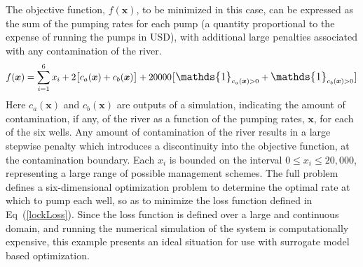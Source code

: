 \documentclass[12pt]{article}
\def \oner {
        \mathlarger{\mathds{1}}
}
\begin{document}
%
The objective function, $f(\bm{x})$, to be minimized in this case, can be expressed as the sum of the pumping rates for each pump (a quantity proportional to the expense of running the pumps in USD), with additional large penalties associated with any contamination of the river. %
\begin{equation}
f(\bm{x}) = \sum_{i=1}^6 x_i +  2\big[ c_a(\bm{x}) + c_b(\bm{x}) \big] + 20000 \big[ \oner_{c_a(\bm{x})>0} + \oner_{c_b(\bm{x})>0} \big] 
\label{lockLoss}
\end{equation}
Here $c_a(\bm{x})$ and $c_b(\bm{x})$ are outputs of a simulation, indicating the amount of contamination, if any, of the river as a function of the pumping rates, $\bm{x}$, for each of the six wells.
%
Any amount of contamination of the river results in a large stepwise penalty which introduces a discontinuity into the objective function, at the contamination boundary.
%
Each $x_i$ is bounded on the interval \mbox{$0\le x_i\le20,000$}, representing a large range of possible management schemes.
%
The full problem defines a six-dimensional optimization problem to determine the optimal rate at which to pump each well, so as to minimize the loss function defined in Eq~(\ref{lockLoss}).
%
Since the loss function is defined over a large and continuous domain, and running the numerical simulation of the system is computationally expensive, this example presents an ideal situation for use with surrogate model based optimization. 



% 
%
\end{document}
